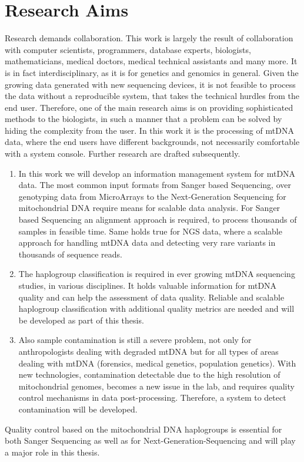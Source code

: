 \section{Research Aims}
\label{researchaims}
Research demands collaboration. This work is largely the result of collaboration with computer scientists, programmers, database experts, biologists, mathematicians, medical doctors, medical technical assistants and many more. It is in fact interdisciplinary, as it is for genetics and genomics in general. Given the growing data generated with new sequencing devices, it is not feasible to process the data without a reproducible system, that takes the technical hurdles from the end user. Therefore, one of the main research aims is on providing sophisticated methods to the biologists, in such a manner that a problem can be solved by hiding the complexity from the user. In this work it is the processing of mtDNA data, where the end users have different backgrounds, not necessarily comfortable with a system console. Further research are drafted subsequently.
\begin{enumerate}
\item
In this work we will develop an information management system for mtDNA data. 
The most common input formats from Sanger based Sequencing, over genotyping data from MicroArrays to the Next-Generation Sequencing for mitochondrial DNA require means for scalable data analysis. 
For Sanger based Sequencing an alignment approach is required, to process thousands of samples in feasible time. Same holds true for NGS data, where a scalable approach for handling mtDNA data and detecting very rare variants in thousands of sequence reads.
\item The haplogroup classification is required in ever growing mtDNA sequencing studies, in various disciplines. It holds valuable information for mtDNA quality and can help the assessment of data quality. Reliable and scalable haplogroup classification with additional quality metrics are needed and will be developed as part of this thesis.
\item Also sample contamination is still a severe problem, not only for anthropologists dealing with degraded mtDNA but for all types of areas dealing with mtDNA (forensics, medical genetics, population genetics). With new technologies, contamination detectable due to the high resolution of mitochondrial genomes, becomes a new issue in the lab, and requires quality control mechanisms in data post-processing. Therefore, a system to detect contamination will be developed. 
\end{enumerate}
Quality control based on the mitochondrial DNA haplogroups is essential for both Sanger Sequencing as well as for Next-Generation-Sequencing and will play a major role in this thesis.

